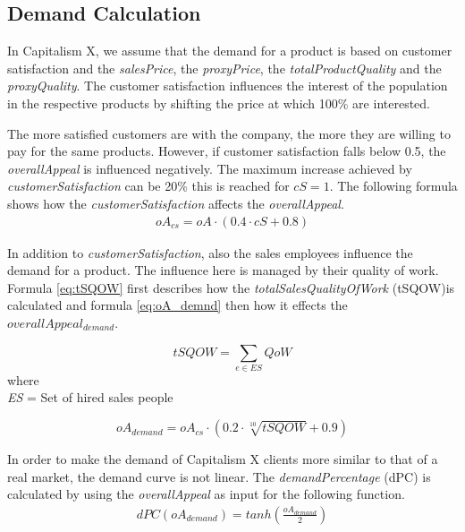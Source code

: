 \subsection{Demand Calculation} \label{demandCalc}

In Capitalism X, we assume that the demand for a product is based on customer satisfaction and the \textit{salesPrice}, the \textit{proxyPrice}, the \textit{totalProductQuality} and the \textit{proxyQuality}. 
The customer satisfaction influences the interest of the population in the respective products by shifting the price at which 100\% are interested.
 
The more satisfied customers are with the company, the more they are willing to pay for the same products. However, if customer satisfaction falls below 0.5, the \textit{overallAppeal} is influenced negatively. The maximum increase achieved by \textit{customerSatisfaction} can be 20\% this is reached for $cS = 1$. The following formula shows how the \textit{customerSatisfaction} affects the \textit{overallAppeal}.
\begin{equation}
\label{func:demandPrice}
\begin{aligned}
 oA_{cs} = oA \cdot (0.4 \cdot cS + 0.8)
\end{aligned}
\end{equation}

In addition to \textit{customerSatisfaction}, also the sales employees influence the demand for a product. The influence here is managed by their quality of work. Formula \ref{eq:tSQOW} first describes how the \textit{totalSalesQualityOfWork} (\gls{tSQOW})is calculated and formula \ref{eq:oA_demnd} then how it effects the \textit{$overallAppeal_{demand}$}.

\begin{center}
\begin{equation}
tSQOW=\sum_{e \in ES}{QoW}
\label{eq:tSQOW}
\end{equation}
where \\
\textit{ES} = Set of hired sales people
\end{center}

\begin{equation}
    oA_{demand} = oA_{cs} \cdot ( 0.2 \cdot \sqrt[10]{tSQOW} + 0.9)   
\label{eq:oA_demnd}
\end{equation}

In order to make the demand of Capitalism X clients more similar to that of a real market, the demand curve is not linear. The \textit{demandPercentage} (\gls{dPC}) is calculated by using the \textit{overallAppeal} as input for the following function. 
\begin{equation}
\label{func:demandPercentage}
\begin{aligned}
dPC(oA_{demand}) = tanh(\frac{oA_{demand}}{2})
\end{aligned}
\end{equation}


